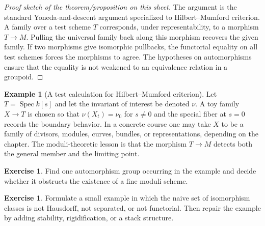 \documentclass[11pt]{amsart}
\theoremstyle{definition}
\newtheorem{example}[theorem]{Example}
\newtheorem{exercise}[theorem]{Exercise}
\newcommand{\Spec}{\operatorname{Spec}}
\begin{document}
\begin{proof}[Proof sketch of the theorem/proposition on this sheet]
The argument is the standard Yoneda-and-descent argument specialized to Hilbert--Mumford criterion.  A family over a test scheme $T$ corresponds, under representability, to a morphism $T\to M$.  Pulling the universal family back along this morphism recovers the given family.  If two morphisms give isomorphic pullbacks, the functorial equality on all test schemes forces the morphisms to agree.  The hypotheses on automorphisms ensure that the equality is not weakened to an equivalence relation in a groupoid.
\end{proof}
\begin{example}[A test calculation for Hilbert--Mumford criterion]
Let $T=\Spec k[s]$ and let the invariant of interest be denoted $\nu$.  A toy family $X\to T$ is chosen so that $\nu(X_t)=\nu_0$ for $s\ne0$ and the special fiber at $s=0$ records the boundary behavior.  In a concrete course one may take $X$ to be a family of divisors, modules, curves, bundles, or representations, depending on the chapter.  The moduli-theoretic lesson is that the morphism $T\to M$ detects both the general member and the limiting point.
\end{example}
\begin{exercise}
Find one automorphism group occurring in the example and decide whether it obstructs the existence of a fine moduli scheme.
\end{exercise}
\begin{exercise}
Formulate a small example in which the naive set of isomorphism classes is not Hausdorff, not separated, or not functorial.  Then repair the example by adding stability, rigidification, or a stack structure.
\end{exercise}
\clearpage
\end{document}
